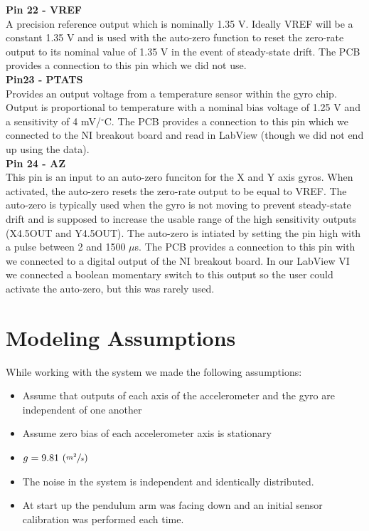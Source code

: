 \documentclass{article}
\theoremstyle{plain}
\theoremstyle{definition}
\theoremstyle{remark}
\begin{document}
\textbf{Pin 22 - VREF}\\
A precision reference output which is nominally 1.35 V. Ideally VREF will be a constant 1.35 V and is used with the auto-zero function to reset the zero-rate output to its nominal value of 1.35 V in the event of steady-state drift. The PCB provides a connection to this pin which we did not use.\\

\textbf{Pin23 - PTATS}\\
Provides an output voltage from a temperature sensor within the gyro chip. Output is proportional to temperature with a nominal bias voltage of 1.25 V and a sensitivity of 4 mV/$^{\circ}$C. The PCB provides a connection to this pin which we connected to the NI breakout board and read in LabView (though we did not end up using the data).\\

\textbf{Pin 24 - AZ}\\
This pin is an input to an auto-zero funciton for the X and Y axis gyros. When activated, the auto-zero resets the zero-rate output to be equal to VREF. The auto-zero is typically used when the gyro is not moving to prevent steady-state drift and is supposed to increase the usable range of the high sensitivity outputs (X4.5OUT and Y4.5OUT). The auto-zero is intiated by setting the pin high with a pulse between 2 and 1500 $\mu$s. The PCB provides a connection to this pin with we connected to a digital output of the NI breakout board. In our LabView VI we connected a boolean momentary switch to this output so the user could activate the auto-zero, but this was rarely used.\\ 

\section{Modeling Assumptions}
While working with the system we made the following assumptions:
\begin{itemize}
\item{Assume that outputs of each axis of the accelerometer and the gyro are independent of one another}
\item{Assume zero bias of each accelerometer axis is stationary} %
\item{$g = 9.81 \, \left( \sfrac{m^2}{s}\right) $}
\item The noise in the system is independent and identically distributed.
\item At start up the pendulum arm was facing down and an initial sensor calibration was performed each time.
\end{itemize}
\end{document}
